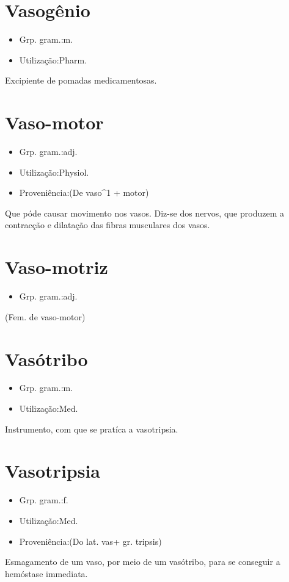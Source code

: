 \documentclass{article}
\begin{document}
\section{Vasogênio}
\begin{itemize}
\item {Grp. gram.:m.}
\end{itemize}
\begin{itemize}
\item {Utilização:Pharm.}
\end{itemize}
Excipiente de pomadas medicamentosas.
\section{Vaso-motor}
\begin{itemize}
\item {Grp. gram.:adj.}
\end{itemize}
\begin{itemize}
\item {Utilização:Physiol.}
\end{itemize}
\begin{itemize}
\item {Proveniência:(De \textunderscore vaso\textunderscore ^1 + \textunderscore motor\textunderscore )}
\end{itemize}
Que póde causar movimento nos vasos.
Diz-se dos nervos, que produzem a contracção e dilatação das fibras musculares dos vasos.
\section{Vaso-motriz}
\begin{itemize}
\item {Grp. gram.:adj.}
\end{itemize}
(Fem. de \textunderscore vaso-motor\textunderscore )
\section{Vasótribo}
\begin{itemize}
\item {Grp. gram.:m.}
\end{itemize}
\begin{itemize}
\item {Utilização:Med.}
\end{itemize}
Instrumento, com que se pratíca a vasotripsia.
\section{Vasotripsia}
\begin{itemize}
\item {Grp. gram.:f.}
\end{itemize}
\begin{itemize}
\item {Utilização:Med.}
\end{itemize}
\begin{itemize}
\item {Proveniência:(Do lat. \textunderscore vas\textunderscore  + gr. \textunderscore tripsis\textunderscore )}
\end{itemize}
Esmagamento de um vaso, por meio de um vasótribo, para se conseguir a hemóstase immediata.
\end{document}

